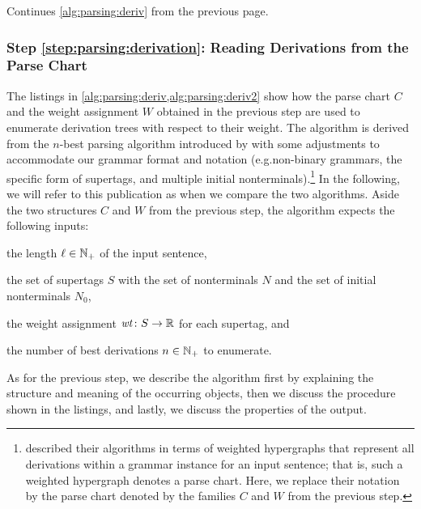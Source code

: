 \documentclass[../../document.tex]{subfiles}
\begin{document}
    \begin{algorithm}
        \caption{\label{alg:parsing:deriv2}
            Continues \cref{alg:parsing:deriv} from the previous page.
        }
        
    \end{algorithm}

    \subsubsection*{Step \ref{step:parsing:derivation}: Reading Derivations from the Parse Chart}
    The listings in \cref{alg:parsing:deriv,alg:parsing:deriv2} show how the parse chart \(C\) and the weight assignment \(W\) obtained in the previous step are used to enumerate derivation trees with respect to their weight.
    The algorithm is derived from the \(n\)-best parsing algorithm introduced by \citet[Algorithms~1, 2 and 3]{HuaChia05} with some adjustments to accommodate our grammar format and notation (e.g.\@ non-binary grammars, the specific form of  supertags, and multiple initial nonterminals).\footnote{
         described their algorithms in terms of weighted hypergraphs that represent all derivations within a grammar instance for an input sentence; that is, such a weighted hypergraph denotes a parse chart.
        Here, we replace their notation by the parse chart denoted by the families \(C\) and \(W\) from the previous step.
    }
    In the following, we will refer to this publication as  when we compare the two algorithms.
    Aside the two structures \(C\) and \(W\) from the previous step, the algorithm expects the following inputs:
    \begin{inparaitem}[]
        \item the length \(\ell \in \mathbb{N}_+\) of the input sentence,
        \item the set of supertags \(S\)  with the set of nonterminals \(N\) and the set of initial nonterminals \(N_0\),
        \item the weight assignment \(\mathit{wt}\colon S \to \mathbb{R}\) for each supertag, and
        \item the number of best derivations \(n \in \mathbb{N}_+\) to enumerate.
    \end{inparaitem}
    As for the previous step, we describe the algorithm first by explaining the structure and meaning of the occurring objects, then we discuss the procedure shown in the listings, and lastly, we discuss the properties of the output.
    
\end{document}
